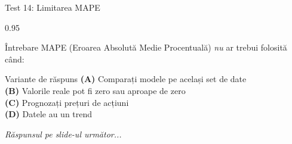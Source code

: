 \documentclass[9pt, aspectratio=169, t]{beamer}
\begin{document}
\begin{frame}{Test 14: Limitarea MAPE}
    \begin{cminipage}{0.95\textwidth}
    \begin{alertblock}{Întrebare}
        MAPE (Eroarea Absolută Medie Procentuală) \emph{nu} ar trebui folosită când:
    \end{alertblock}

    \vspace{0.4cm}

    \begin{block}{Variante de răspuns}
    \textcolor{MainBlue}{\textbf{(A)}} Comparați modele pe același set de date\\[3pt]
    \textcolor{MainBlue}{\textbf{(B)}} Valorile reale pot fi zero sau aproape de zero\\[3pt]
    \textcolor{MainBlue}{\textbf{(C)}} Prognozați prețuri de acțiuni\\[3pt]
    \textcolor{MainBlue}{\textbf{(D)}} Datele au un trend
    \end{block}
    \vspace{0.5cm}

    \begin{center}
        \textit{Răspunsul pe slide-ul următor...}
    \end{center}
    \end{cminipage}
\end{frame}
\end{document}
